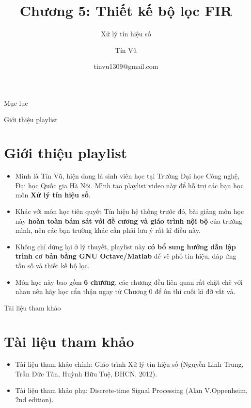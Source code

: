 \documentclass[8pt]{beamer}
\title[Chương 5: Thiết kế bộ lọc FIR] %
{Chương 5: Thiết kế bộ lọc FIR}
\subtitle{Xử lý tín hiệu số}
\author[Xử lý tín hiệu số] %
{Tín Vũ}
\date[VLC 2021] %
{tinvu1309@gmail.com}
\begin{document}
\frame{\titlepage}
\begin{frame}{Mục lục}
	\tableofcontents
\end{frame}
\begin{frame}{Giới thiệu playlist}
	\section{Giới thiệu playlist}
	\begin{itemize}
		\item Mình là Tín Vũ, hiện đang là sinh viên học tại Trường Đại học Công nghệ, Đại học Quốc gia Hà Nội. Mình tạo playlist video này để hỗ trợ các bạn học môn \textbf{Xử lý tín hiệu số}.
		\item Khác với môn học tiên quyết \alert{Tín hiệu hệ thống} trước đó, bài giảng môn học này \textbf{hoàn toàn bám sát với đề cương và giáo trình nội bộ} của trường mình, nên các bạn trường khác cần phải lưu ý rất kĩ điều này.
		\item Không chỉ dừng lại ở lý thuyết, playlist này \textbf{có bổ sung hướng dẫn lập trình cơ bản bằng GNU Octave/Matlab} để vẽ phổ tín hiệu, đáp ứng tần số và thiết kế bộ lọc.
		\item Môn học này bao gồm \textbf{6 chương}, các chương đều liên quan rất chặt chẽ với nhau nên hãy học cẩn thận ngay từ \alert{Chương 0} để ôn thi cuối kì đỡ vất vả.
	\end{itemize}
\end{frame}
\begin{frame}{Tài liệu tham khảo}
	\section{Tài liệu tham khảo}
	\begin{itemize}
		\item Tài liệu tham khảo chính: Giáo trình Xử lý tín hiệu số (Nguyễn Linh Trung, Trần Đức Tân, Huỳnh Hữu Tuệ, ĐHCN, 2012).
		\item Tài liệu tham khảo phụ: Discrete-time Signal Processing (Alan V.Oppenheim, 2nd edition).
	\end{itemize}
\end{frame}
\end{document}
